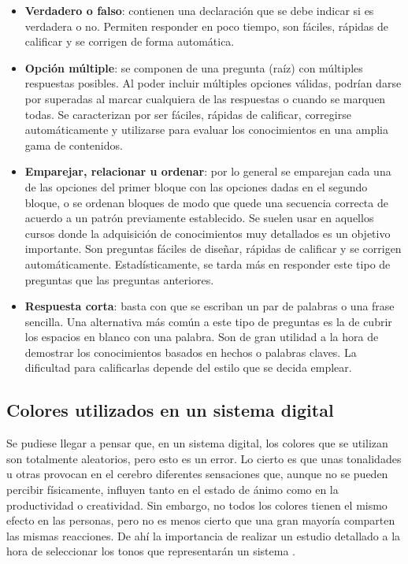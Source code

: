 \begin{itemize}
\item \textbf{Verdadero o falso}: contienen una declaración que se debe indicar si es verdadera o no. Permiten responder en poco tiempo, son fáciles, rápidas de calificar y se corrigen de forma automática.
\item \textbf{Opción múltiple}: se componen de una pregunta (raíz) con múltiples respuestas posibles. Al poder incluir múltiples opciones válidas, podrían darse por superadas al marcar cualquiera de las respuestas o cuando se marquen todas. Se caracterizan por ser fáciles, rápidas de calificar, corregirse automáticamente y utilizarse para evaluar los conocimientos en una amplia gama de contenidos.
\item \textbf{Emparejar, relacionar u ordenar}: por lo general se emparejan cada una de las opciones del primer bloque con las opciones dadas en el segundo bloque, o se ordenan bloques de modo que quede una secuencia correcta de acuerdo a un patrón previamente establecido. Se suelen usar en aquellos cursos donde la adquisición de conocimientos muy detallados es un objetivo importante. Son preguntas fáciles de diseñar, rápidas de calificar y se corrigen automáticamente. Estadísticamente, se tarda más en responder este tipo de preguntas que las preguntas anteriores.
\item \textbf{Respuesta corta}: basta con que se escriban un par de palabras o una frase sencilla. Una alternativa más común a este tipo de preguntas es la de cubrir los espacios en blanco con una palabra. Son de gran utilidad a la hora de demostrar los conocimientos basados en hechos o palabras claves. La dificultad para calificarlas depende del estilo que se decida emplear.
\end{itemize}

\subsection{Colores utilizados en un sistema digital}
Se pudiese llegar a pensar que, en un sistema digital, los colores que se utilizan son totalmente aleatorios, pero esto es un error. Lo cierto es que unas tonalidades u otras provocan en el cerebro diferentes sensaciones que, aunque no se pueden percibir físicamente, influyen tanto en el estado de ánimo como en la productividad o creatividad. Sin embargo, no todos los colores tienen el mismo efecto en las personas, pero no es menos cierto que una gran mayoría comparten las mismas reacciones. De ahí la importancia de realizar un estudio detallado a la hora de seleccionar los tonos que representarán un sistema \cite{Paspuezan2022}.

